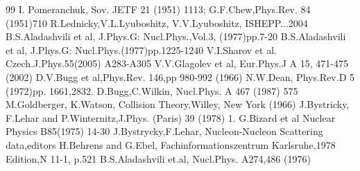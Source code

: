 \documentclass[a4paper,12pt]{article}
\begin{document}
\begin {thebibliography} {99}
I. Pomeranchuk, Sov. JETF 21 (1951) 1113;
  G.F.Chew,Phys.Rev. 84 (1951)710
R.Lednicky,V.L.Lyuboshitz, V.V.Lyuboshitz, ISHEPP...2004
B.S.Aladashvili et al, J.Phys.G: Nucl.Phys.,Vol.3,
  (1977)pp.7-20
B.S.Aladashvili et al, J.Phys.G:
  Nucl.Phys.(1977)pp.1225-1240
V.I.Sharov et al. Czech.J.Phys.55(2005) A283-A305
V.V.Glagolev et al, Eur.Phys.J A 15, 471-475 (2002)
D.V.Bugg et al,Phys.Rev. 146,pp 980-992 (1966)
 N.W.Dean, Phys.Rev.D 5 (1972)pp. 1661,2832.
D.Bugg,C.Wilkin, Nucl.Phys. A 467 (1987) 575
M.Goldberger, K.Watson, Collision Theory,Willey, New York
  (1966)
J.Bystricky, F.Lehar and P.Winternitz,J.Phys. (Paris) 39
  (1978) 1.
G.Bizard et al Nuclear Physics B85(1975) 14-30
J.Bystrycky,F.Lehar, Nucleon-Nucleon Scattering
  data,editors H.Behrens and G.Ebel, Fachinformationszentrum
  Karlsruhe,1978 Edition,N 11-1, p.521
 B.S.Aladashvili et.al, Nucl.Phys. A274,486 (1976)
\end {thebibliography}

\clearpage 
\end{document}
